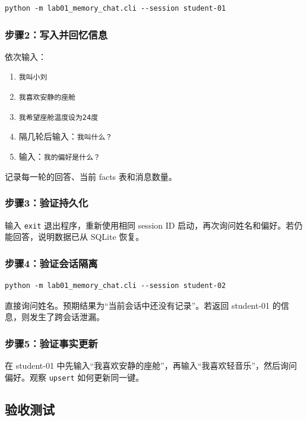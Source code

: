 \documentclass[UTF8,zihao=-4]{ctexart}
\begin{document}
\begin{lstlisting}
python -m lab01_memory_chat.cli --session student-01
\end{lstlisting}

\subsubsection{步骤2：写入并回忆信息}

依次输入：

\begin{enumerate}
  \item \texttt{我叫小刘}
  \item \texttt{我喜欢安静的座舱}
  \item \texttt{我希望座舱温度设为24度}
  \item 隔几轮后输入：\texttt{我叫什么？}
  \item 输入：\texttt{我的偏好是什么？}
\end{enumerate}

记录每一轮的回答、当前 facts 表和消息数量。

\subsubsection{步骤3：验证持久化}

输入 \texttt{exit} 退出程序，重新使用相同 session ID 启动，再次询问姓名和偏好。若仍能回答，说明数据已从 SQLite 恢复。

\subsubsection{步骤4：验证会话隔离}

\begin{lstlisting}
python -m lab01_memory_chat.cli --session student-02
\end{lstlisting}

直接询问姓名。预期结果为“当前会话中还没有记录”。若返回 student-01 的信息，则发生了跨会话泄漏。

\subsubsection{步骤5：验证事实更新}

在 student-01 中先输入“我喜欢安静的座舱”，再输入“我喜欢轻音乐”，然后询问偏好。观察 \texttt{upsert} 如何更新同一键。

\subsection{验收测试}
\end{document}

